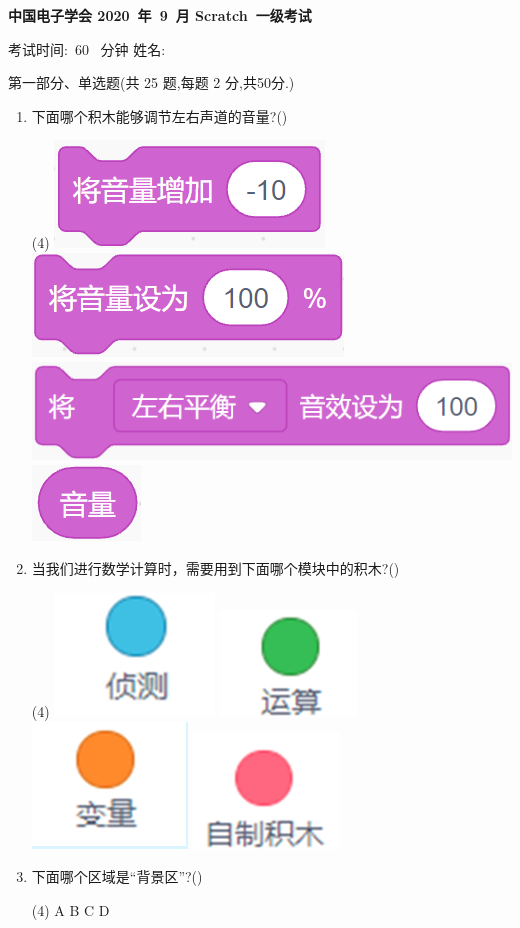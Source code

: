 \documentclass[10pt, a4paper]{article}
\newcommand{\Title}[3]{
    \begin{center}
        \Large \textbf{中国电子学会 #1~年~#2~月 Scratch~#3级考试}
    \end{center}
}
\newcommand{\TimeAndName}[1]{
    \begin{center}
        考试时间:~#1~ 分钟 \qquad\qquad\qquad\qquad 姓名:\underline{\quad\quad\quad\quad}
    \end{center}
}
\begin{document}
    \Title{2020}{9}{一}
    
    \TimeAndName{60}
    
    {\noindent\heiti 第一部分、单选题(共 25 题,每题 2 分,共50分.)}

    \begin{enumerate}
        \item 下面哪个积木能够调节左右声道的音量?(\qquad)
        \begin{tasks}(4)
            \task \includegraphics[width=.1\textwidth]{1a.png}
            \task \includegraphics[width=.12\textwidth]{1b.png}
            \task \includegraphics[width=.18\textwidth]{1c.png}
            \task \includegraphics[width=.05\textwidth]{1d.png}
        \end{tasks}

        \item 当我们进行数学计算时，需要用到下面哪个模块中的积木?(\qquad)
        \begin{tasks}(4)
            \task \includegraphics[width=.05\textwidth]{2a.png}
            \task \includegraphics[width=.05\textwidth]{2b.png}
            \task \includegraphics[width=.05\textwidth]{2c.png}
            \task \includegraphics[width=.05\textwidth]{2d.png}
        \end{tasks}

        \item 下面哪个区域是“背景区”?(\qquad)
        \begin{tasks}(4)
            \task A
            \task B
            \task C
            \task D
        \end{tasks}


\end{enumerate}
\end{document}
